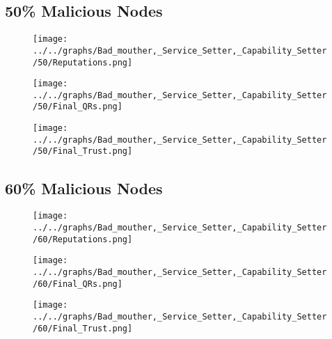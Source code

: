 \begin{minipage}[t]{0.49\columnwidth}
\subsection*{50\% Malicious Nodes}
    \begin{figure}[H]
        \centering
        \texttt{[image: ../../graphs/Bad\_mouther,\_Service\_Setter,\_Capability\_Setter/50/Reputations.png]}
    \end{figure}
    \begin{figure}[H]
        \centering
        \texttt{[image: ../../graphs/Bad\_mouther,\_Service\_Setter,\_Capability\_Setter/50/Final\_QRs.png]}
    \end{figure}
\end{minipage}
\begin{minipage}[t]{0.49\columnwidth}
    \begin{figure}[H]
        \centering
        \texttt{[image: ../../graphs/Bad\_mouther,\_Service\_Setter,\_Capability\_Setter/50/Final\_Trust.png]}
    \end{figure}
\end{minipage}

\begin{minipage}[t]{0.49\columnwidth}
\subsection*{60\% Malicious Nodes}
    \begin{figure}[H]
        \centering
        \texttt{[image: ../../graphs/Bad\_mouther,\_Service\_Setter,\_Capability\_Setter/60/Reputations.png]}
    \end{figure}
    \begin{figure}[H]
        \centering
        \texttt{[image: ../../graphs/Bad\_mouther,\_Service\_Setter,\_Capability\_Setter/60/Final\_QRs.png]}
    \end{figure}
\end{minipage}
\begin{minipage}[t]{0.49\columnwidth}
    \begin{figure}[H]
        \centering
        \texttt{[image: ../../graphs/Bad\_mouther,\_Service\_Setter,\_Capability\_Setter/60/Final\_Trust.png]}
    \end{figure}
\end{minipage}

